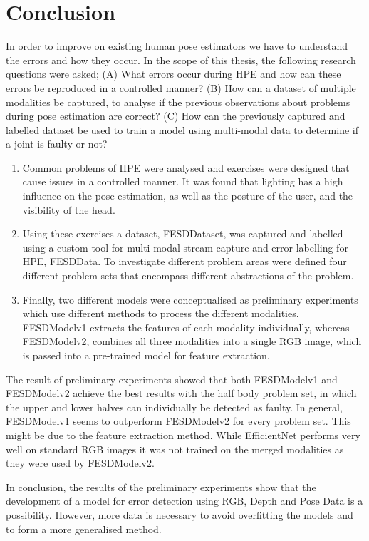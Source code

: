 \chapter{Conclusion}
\label{sec:conclusion}

In order to improve on existing human pose estimators we have to understand the errors and how they occur. In the scope of this thesis, the following research questions were asked; (A) What errors occur during HPE and how can these errors be reproduced in a controlled manner? (B) How can a dataset of multiple modalities be captured, to analyse if the previous observations about problems during pose estimation are correct? (C) How can the previously captured and labelled dataset be used to train a model using multi-modal data to determine if a joint is faulty or not? 

\begin{enumerate}[label=\Alph*]
  \item Common problems of HPE were analysed and exercises were designed that cause issues in a controlled manner. It was found that lighting has a high influence on the pose estimation, as well as the posture of the user, and the visibility of the head.
  \item Using these exercises a dataset, FESDDataset, was captured and labelled using a custom tool for multi-modal stream capture and error labelling for HPE, FESDData. To investigate different problem areas were defined four different problem sets that encompass different abstractions of the problem. 
  \item Finally, two different models were conceptualised as preliminary experiments which use different methods to process the different modalities. FESDModelv1 extracts the features of each modality individually, whereas FESDModelv2, combines all three modalities into a single RGB image, which is passed into a pre-trained model for feature extraction.
\end{enumerate}

The result of preliminary experiments showed that both FESDModelv1 and FESDModelv2 achieve the best results with the half body problem set, in which the upper and lower halves can individually be detected as faulty. In general, FESDModelv1 seems to outperform FESDModelv2 for every problem set. This might be due to the feature extraction method. While EfficientNet performs very well on standard RGB images it was not trained on the merged modalities as they were used by FESDModelv2. 

In conclusion, the results of the preliminary experiments show that the development of a model for error detection using RGB, Depth and Pose Data is a possibility. However, more data is necessary to avoid overfitting the models and to form a more generalised method.

